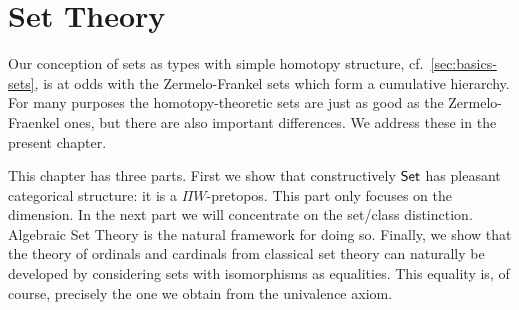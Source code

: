 \chapter{Set Theory}
\label{cha:set-math}

Our conception of sets as types with simple homotopy structure, cf.\
\autoref{sec:basics-sets}, is at odds with the Zermelo-Frankel sets which form a
cumulative hierarchy. For many purposes the homotopy-theoretic sets are just as good as
the Zermelo-Fraenkel ones, but there are also important differences. We address these in
the present chapter. 

This chapter has three parts. First we show that constructively $\mathsf{Set}$ has pleasant categorical structure: it is a
$\Pi W$-pretopos. This part only focuses on the dimension. In the next part we will concentrate on the set/class distinction. Algebraic Set
Theory is the natural framework for doing so. Finally, we show that the theory of ordinals and cardinals from classical set theory can
naturally be developed by considering sets with isomorphisms as equalities. This equality is, of course, precisely the one we obtain from
the univalence axiom.

